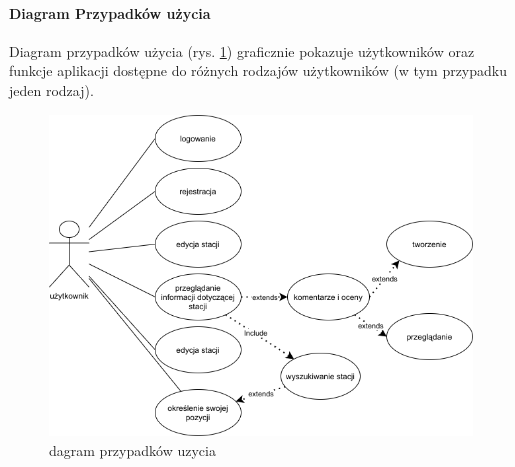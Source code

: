\paragraph{Diagram Przypadków użycia}
Diagram przypadków użycia (rys. \ref{fig:usecasediagram}) graficznie pokazuje użytkowników oraz funkcje aplikacji dostępne do różnych rodzajów użytkowników (w tym przypadku jeden rodzaj).
\begin{figure}[ht]
    \centering
        \includegraphics[width=0.7\linewidth]{rys02/use_case_diagram.png}
        \caption{dagram przypadków uzycia \cite{diagrams_net}}
    \label{fig:usecasediagram}
\end{figure}
\newpage
